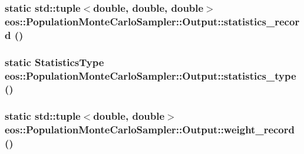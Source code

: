\label{structeos_1_1PopulationMonteCarloSampler_1_1Output_ac9825b152fa3750d77cb7face4fbaf41}
\hypertarget{structeos_1_1PopulationMonteCarloSampler_1_1Output_af58401b36b817e48635dfebfa54163e4}{
\subsubsection[{statistics\_\-record}]{\setlength{\rightskip}{0pt plus 5cm}static std::tuple$<$double, double, double$>$ eos::PopulationMonteCarloSampler::Output::statistics\_\-record ()}}
\label{structeos_1_1PopulationMonteCarloSampler_1_1Output_af58401b36b817e48635dfebfa54163e4}
\hypertarget{structeos_1_1PopulationMonteCarloSampler_1_1Output_ab943ce812be9756d846719e165f352a7}{
\subsubsection[{statistics\_\-type}]{\setlength{\rightskip}{0pt plus 5cm}static {\bf StatisticsType} eos::PopulationMonteCarloSampler::Output::statistics\_\-type ()}}
\label{structeos_1_1PopulationMonteCarloSampler_1_1Output_ab943ce812be9756d846719e165f352a7}
\hypertarget{structeos_1_1PopulationMonteCarloSampler_1_1Output_a6bcb392149e9b1f026f96d123f88d9d8}{
\subsubsection[{weight\_\-record}]{\setlength{\rightskip}{0pt plus 5cm}static std::tuple$<$double, double$>$ eos::PopulationMonteCarloSampler::Output::weight\_\-record ()}}
